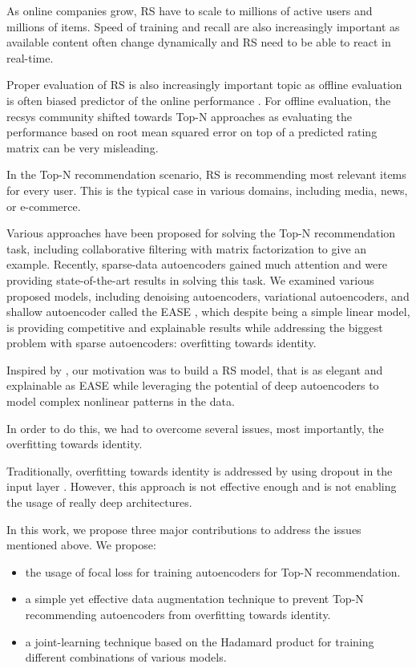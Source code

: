 \documentclass[conference]{IEEEtran}
\begin{document}
    As online companies grow, RS have to scale to millions of active users and millions of items. Speed of training and recall are also increasingly important as available content often change dynamically and RS need to be able to react in real-time. 
    
    Proper evaluation of RS is also increasingly important topic as offline evaluation is often biased predictor of the online performance \cite{rehorek2018comparing}. For offline evaluation, the recsys community shifted towards Top-N approaches \cite{karypis2001evaluation} as evaluating the performance based on root mean squared error on top of a predicted rating matrix can be very misleading.    
    
    In the Top-N recommendation scenario\cite{Cremonesi2010}, RS is recommending  most relevant items for every user. This is the typical case in various domains, including media, news, or e-commerce.
    
    Various approaches have been proposed for solving the Top-N recommendation task, including collaborative filtering with matrix factorization to give an example. Recently, sparse-data autoencoders \cite{vincent2008extracting,ng2011sparse,Sedhain2015,Liang2018,Kim2019,Shenbin2020} gained much attention and were providing state-of-the-art results in solving this task.
We examined various proposed models, including denoising autoencoders, variational autoencoders, and shallow autoencoder called the EASE \cite{Steck2019}, which despite being a simple linear model, is providing competitive and explainable results while addressing the biggest problem with sparse autoencoders: overfitting towards identity.
    
    Inspired by \cite{Cheng2016}, our motivation was to build a RS model, that is as elegant and explainable as EASE while leveraging the potential of deep autoencoders to model complex nonlinear patterns in the data. 
    
    In order to do this, we had to overcome several issues, most importantly, the overfitting towards identity.

    Traditionally,  overfitting towards identity is addressed by using dropout in the input layer \cite{Liang2018,Shenbin2020,Kim2019}. However, this approach is not effective enough and is not enabling the usage of really deep architectures.

    In this work, we propose three major contributions to address the issues mentioned above.  We propose:
    \begin{itemize}
    \item the usage of focal loss for training autoencoders for Top-N recommendation. 
    \item a simple yet effective data augmentation technique to prevent Top-N recommending autoencoders from overfitting towards identity. 
    \item a joint-learning technique based on the Hadamard product for training different combinations of various models. 
    \end{itemize}
    
\end{document}
